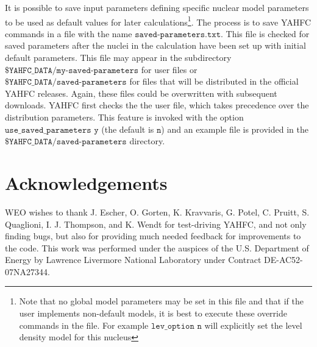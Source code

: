 \documentclass[
10pt,
showpacs,preprintnumbers,footinbib,
amsfonts,amsmath,amssymb,
aps,
prc,twocolumn,groupedaddress,superscriptaddress,
showkeys,
nofootinbib
]{revtex4-1}
\begin{document}
It is possible to save input parameters defining specific nuclear model parameters to be used as default values for later calculations\footnote{Note that no global model parameters may be set in this file and that if the user implements non-default models, it is best to execute these override commands in the file. For example ${\texttt{lev\_option n}}$ will explicitly set the level density model for this nucleus}. The process is to save YAHFC commands in a file with the name 
${\texttt{saved-parameters.txt}}$. This file is checked for saved parameters after the nuclei in the calculation have been set up with initial default parameters. This file may appear in the subdirectory ${\texttt{\$YAHFC\_DATA/my-saved-parameters}}$ for user files or ${\texttt{\$YAHFC\_DATA/saved-parameters}}$ for files that will be distributed in the official YAHFC releases. Again, these files could be overwritten with subsequent downloads. YAHFC first checks the the user file, which takes precedence over the distribution parameters.  This feature is invoked with the option ${\texttt{use\_saved\_parameters y}}$ (the default is ${\texttt{n}}$) and an example file is provided in the ${\texttt{\$YAHFC\_DATA/saved-parameters}}$ directory.

\section{Acknowledgements}

WEO wishes to thank J. Escher, O. Gorten, K. Kravvaris, G. Potel, C. Pruitt, S. Quaglioni, I. J. Thompson, and K. Wendt for test-driving YAHFC, and not only finding bugs, but also for providing much needed feedback for improvements to the code. This work was performed under the auspices of the U.S. Department of Energy by Lawrence Livermore National Laboratory under Contract DE-AC52-07NA27344.

\appendix
\end{document}
